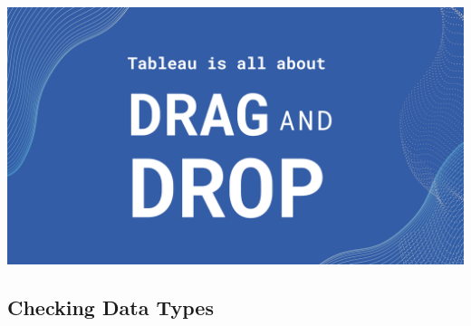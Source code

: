 \documentclass[
]{book}
\begin{document}
\includegraphics{images/M3S1_image1_draganddrop.png}

\hypertarget{checking-data-types}{%
\subsection{Checking Data Types}\label{checking-data-types}}
\end{document}
